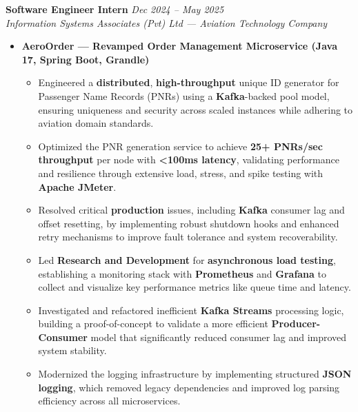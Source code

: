 \noindent
\textbf{Software Engineer Intern} \hfill \textit{Dec 2024 -- May 2025}\\
\noindent
\textit{Information Systems Associates (Pvt) Ltd --- Aviation Technology Company}\\[0.05em]

\begin{itemize}[leftmargin=*, itemsep=0.3em, topsep=0.01em]

    \item \textbf{AeroOrder --- Revamped Order Management Microservice (Java 17, Spring Boot, Grandle)}
    \begin{itemize}[leftmargin=1.5em, itemsep=0.2em, topsep=0.1em]
        \item Engineered a \textbf{distributed}, \textbf{high-throughput} unique ID generator for Passenger Name Records (PNRs) using a \textbf{Kafka}-backed pool model, ensuring uniqueness and security across scaled instances while adhering to aviation domain standards.
        \item Optimized the PNR generation service to achieve \textbf{25+ PNRs/sec throughput} per node with \textbf{<100ms latency}, validating performance and resilience through extensive load, stress, and spike testing with \textbf{Apache JMeter}.
        \item Resolved critical \textbf{production} issues, including \textbf{Kafka} consumer lag and offset resetting, by implementing robust shutdown hooks and enhanced retry mechanisms to improve fault tolerance and system recoverability.
        \item Led \textbf{Research and Development} for \textbf{asynchronous load testing}, establishing a monitoring stack with \textbf{Prometheus} and \textbf{Grafana} to collect and visualize key performance metrics like queue time and latency.
        \item Investigated and refactored inefficient \textbf{Kafka Streams} processing logic, building a proof-of-concept to validate a more efficient \textbf{Producer-Consumer} model that significantly reduced consumer lag and improved system stability.
        \item Modernized the logging infrastructure by implementing structured \textbf{JSON logging}, which removed legacy dependencies and improved log parsing efficiency across all microservices.
    \end{itemize}


\end{itemize}
